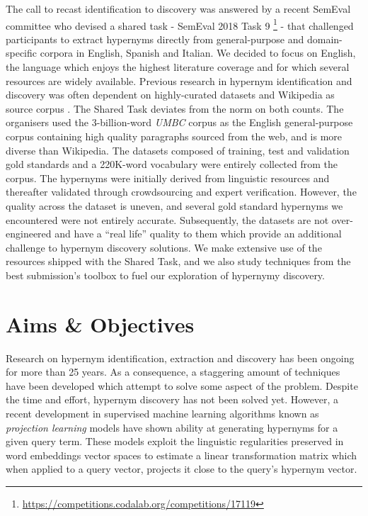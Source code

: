 The call to recast identification to discovery was answered by a recent SemEval committee who devised a shared task - SemEval 2018 Task 9 \footnote{\url{https://competitions.codalab.org/competitions/17119}} - that challenged participants to extract hypernyms directly from general-purpose and domain-specific corpora in English, Spanish and Italian.  We decided to focus on English, the language which enjoys the highest literature coverage and for which several resources are widely available.  Previous research in hypernym identification and discovery was often dependent on highly-curated datasets and Wikipedia as source corpus \citep{Snow2004, shwartz2017siege, levy2015supervised, weeds2014learning}.  The Shared Task deviates from the norm on both counts.  The organisers used the 3-billion-word \textit{UMBC} corpus as the English general-purpose corpus containing high quality paragraphs sourced from the web, and is more diverse than Wikipedia.  The datasets composed of training, test and validation gold standards and a 220K-word vocabulary were entirely collected from the corpus.  The hypernyms were initially derived from linguistic resources and thereafter validated through crowdsourcing and expert verification.  However, the quality across the dataset is uneven, and several gold standard hypernyms we encountered were not entirely accurate.  Subsequently, the datasets are not over-engineered and have a ``real life'' quality to them which provide an additional challenge to hypernym discovery solutions.  We make extensive use of the resources shipped with the Shared Task, and we also study techniques from the best submission's toolbox to fuel our exploration of hypernymy discovery.

\section{Aims \& Objectives}
Research on hypernym identification, extraction and discovery has been ongoing for more than 25 years.  As a consequence, a staggering amount of techniques have been developed which attempt to solve some aspect of the problem.  Despite the time and effort, hypernym discovery has not been solved yet.  However, a recent development in supervised machine learning algorithms known as \textit{projection learning} models have shown ability at generating hypernyms for a given query term.  These models exploit the  linguistic regularities preserved in word embeddings vector spaces to estimate a linear transformation matrix which when applied to a query vector, projects it close to the query's hypernym vector.

